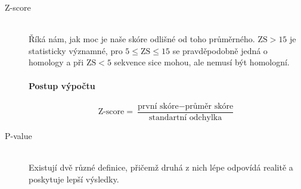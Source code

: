 \documentclass[DIV=8]{scrreprt}
\begin{document}
\begin{description}
\item[Z-score]\hfill \\
Říká nám, jak moc je naše skóre odlišné od toho průměrného. \(\text{ZS} > 15\) je statisticky významné, pro \(5 \leq \text{ZS} \leq 15\) se pravděpodobně jedná o homology a při \(\text{ZS} < 5\) sekvence sice mohou, ale nemusí být homologní.

\paragraph{Postup výpočtu}



\[\text{Z-score} = \frac{\text{první skóre} - \text{průměr skóre}}{\text{standartní odchylka}}\]


\item[P-value]\hfill \\
Existují dvě různé definice, přičemž druhá z nich lépe odpovídá realitě a poskytuje lepší výsledky.




\end{description}
\end{document}
